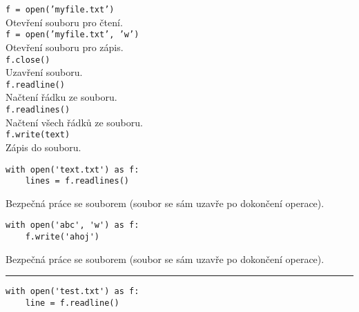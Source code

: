 \documentclass[12pt,a4paper]{article}
\begin{document}
\pagestyle{empty}

\setlength\parindent{0pt}
\setlength{\columnsep}{60pt}
\begin{multicols}{2}

\Large

\texttt{f = open('myfile.txt')}\\

Otevření souboru pro čtení.\\

\texttt{f = open('myfile.txt', 'w')}\\

Otevření souboru pro zápis.\\

\texttt{f.close()}\\

Uzavření souboru.\\

\texttt{f.readline()}\\

Načtení řádku ze souboru.\\

\texttt{f.readlines()}\\

Načtení všech řádků ze souboru.\\

\texttt{f.write(text)}\\

Zápis do souboru.

\begin{verbatim}
with open('text.txt') as f:
    lines = f.readlines()
\end{verbatim}

Bezpečná práce se souborem (soubor se sám uzavře po dokončení operace).

\begin{verbatim}
with open('abc', 'w') as f:
    f.write('ahoj')
\end{verbatim}

Bezpečná práce se souborem (soubor se sám uzavře po dokončení operace).\\

\rule{\linewidth}{1pt}

\begin{verbatim}
with open('test.txt') as f:
    line = f.readline()
\end{verbatim}

\end{multicols}
\end{document}
